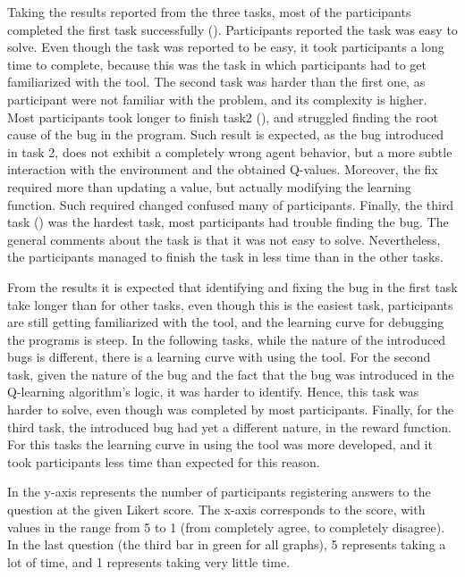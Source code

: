 Taking the results reported from the three tasks, most of the participants completed the first task 
successfully (). Participants reported the task was easy to solve. Even though the task 
was reported to be easy, it took participants a long time to complete, because this was the task in 
which participants had to get familiarized with the tool. The second task was harder than the first one, 
as participant were not familiar with the problem, and its complexity is higher. Most participants took 
longer to finish task2 (), and struggled finding the root cause of the bug in the program. 
Such result is expected, as the bug introduced in task 2, does not exhibit a completely wrong agent 
behavior, but a more subtle interaction with the environment and the obtained Q-values. Moreover, the 
fix required more than updating a value, but actually modifying the learning function. Such required 
changed confused many of participants. Finally, the third task () was the hardest 
task, most participants had trouble finding the bug. The general comments about the task is that it 
was not easy to solve. Nevertheless, the participants managed to finish the task in less time than in 
the other tasks. 

From the results it is expected that identifying and fixing the bug in the first task take longer than for 
other tasks, even though this is the easiest task, participants are still getting familiarized with the tool, 
and the learning curve for debugging the programs is steep. In the following tasks, while the nature of 
the introduced bugs is different, there is a learning curve  with using the tool. For the second task,
given the nature of the bug and the fact that the bug was introduced in the Q-learning algorithm's 
logic, it was harder to identify. Hence, this task was harder to solve, even though was completed by 
most participants. Finally, for the third task, the introduced bug had yet a different nature, in the 
reward function. For this tasks the learning curve in using the tool was more developed, and it took 
participants less time than expected for this reason.

In  the y-axis represents the number of participants registering 
answers to the question at the given Likert score. The x-axis corresponds to the score, with
values in the range from 5 to 1 (from completely agree, to completely disagree). In the last 
question (the third bar in green for all graphs), 5 represents taking a lot of time, and 1 represents 
taking very little time.

